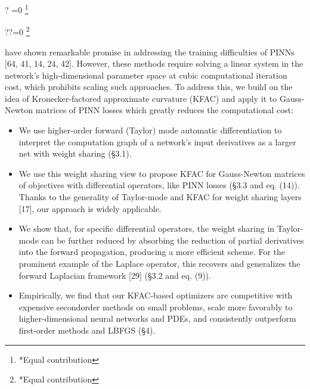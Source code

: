 \documentclass[10pt]{article}
\let\svthefootnote\thefootnote
\newcommand\blfootnotetext[1]{%
  \let\thefootnote\relax\footnote{#1}%
  \addtocounter{footnote}{-1}%
  \let\thefootnote\svthefootnote%
}
\let\svfootnotetext\footnotetext
\renewcommand\footnotetext[2][?]{%
  \if\relax#1\relax%
    \ifnum\value{footnote}=0\blfootnotetext{#2}\else\svfootnotetext{#2}\fi%
  \else%
    \if?#1\ifnum\value{footnote}=0\blfootnotetext{#2}\else\svfootnotetext{#2}\fi%
    \else\svfootnotetext[#1]{#2}\fi%
  \fi
}
\begin{document}
have shown remarkable promise in addressing the training difficulties of PINNs [64, 41, 14, 24, 42]. However, these methods require solving a linear system in the network's high-dimensional parameter space at cubic computational iteration cost, which prohibits scaling such approaches. To address this, we build on the idea of Kronecker-factored approximate curvature (KFAC) and apply it to Gauss-Newton matrices of PINN losses which greatly reduces the computational cost:

\begin{itemize}
  \item We use higher-order forward (Taylor) mode automatic differentiation to interpret the computation graph of a network's input derivatives as a larger net with weight sharing (§3.1).
  \item We use this weight sharing view to propose KFAC for Gauss-Newton matrices of objectives with differential operators, like PINN losses (§3.3 and eq. (14)). Thanks to the generality of Taylor-mode and KFAC for weight sharing layers [17], our approach is widely applicable.
  \item We show that, for specific differential operators, the weight sharing in Taylor-mode can be further reduced by absorbing the reduction of partial derivatives into the forward propagation, producing a more efficient scheme. For the prominent example of the Laplace operator, this recovers and generalizes the forward Laplacian framework [29] (§3.2 and eq. (9)).
  \item Empirically, we find that our KFAC-based optimizers are competitive with expensive secondorder methods on small problems, scale more favorably to higher-dimensional neural networks and PDEs, and consistently outperform first-order methods and LBFGS (§4).
\end{itemize}
\end{document}
